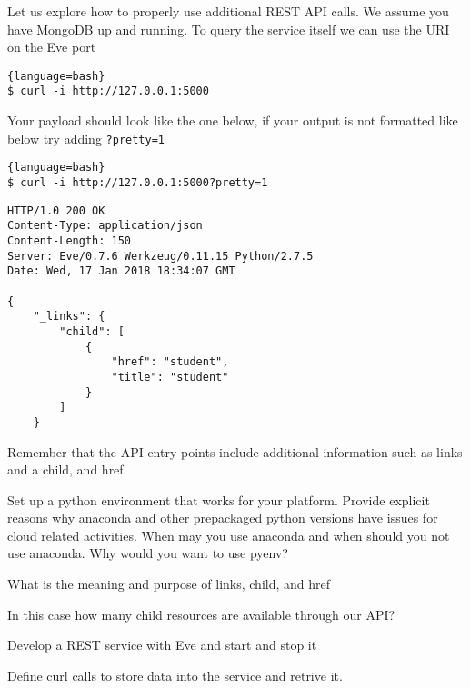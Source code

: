 Let us explore how to properly use additional REST API calls. We
assume you have MongoDB up and running. To query the service itself we
can use the URI on the Eve port


\begin{lstlisting}{language=bash}
$ curl -i http://127.0.0.1:5000
\end{lstlisting}

Your payload should look like the one below, if your output is not
formatted like below try adding \verb|?pretty=1|

\begin{lstlisting}{language=bash}
$ curl -i http://127.0.0.1:5000?pretty=1
\end{lstlisting}

\begin{lstlisting}
HTTP/1.0 200 OK
Content-Type: application/json
Content-Length: 150
Server: Eve/0.7.6 Werkzeug/0.11.15 Python/2.7.5
Date: Wed, 17 Jan 2018 18:34:07 GMT

{
    "_links": {
        "child": [
            {
                "href": "student",
                "title": "student"
            }
        ]
    }
\end{lstlisting}

Remember that the API entry points include additional information such
as links and a child, and href.



\begin{exercise}
Set up a python environment that works for your platform. Provide
explicit reasons why anaconda and other prepackaged python versions
have issues for cloud related activities. When may you use anaconda
and when should you not use anaconda. Why would you want to use pyenv?
\end{exercise}

\begin{exercise}
What is the meaning and purpose of links, child, and href
\end{exercise}

\begin{exercise}
In this case how many child resources are available through
our API?
\end{exercise}

\begin{exercise}
Develop a REST service with Eve and start and stop it
\end{exercise}

\begin{exercise}
Define curl calls to store data into the service and retrive it.
\end{exercise}

